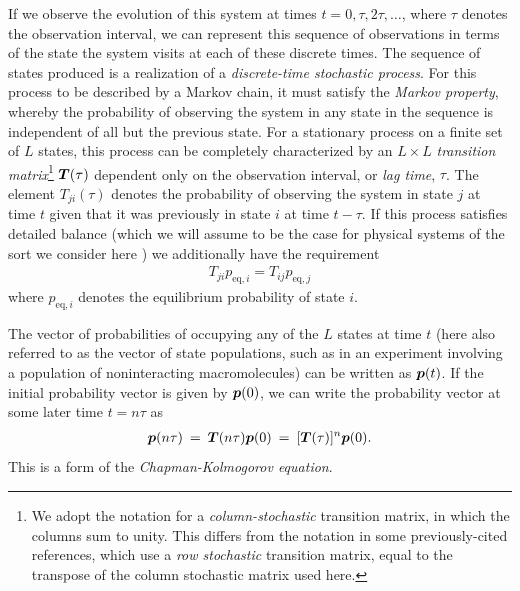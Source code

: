 If we observe the evolution of this system at times $t = 0, \tau, 2 \tau, \ldots$, where $\tau$ denotes the observation interval, we can represent this sequence of observations in terms of the state the system visits at each of these discrete times.
The sequence of states produced is a realization of a \emph{discrete-time stochastic process}.
For this process to be described by a Markov chain, it must satisfy the \emph{Markov property}, whereby the probability of observing the system in any state in the sequence is independent of all but the previous state.
For a stationary process on a finite set of $L$ states, this process can be completely characterized by an $L \times L$ \emph{transition matrix}\footnote{We adopt the notation for a \emph{column-stochastic} transition matrix, in which the columns sum to unity.  This differs from the notation in some previously-cited references, which use a \emph{row stochastic} transition matrix, equal to the transpose of the column stochastic matrix used here.} ${\mbox{\boldmath{$T$}}}(\tau)$ dependent only on the observation interval, or \emph{lag time}, $\tau$.
The element $T_{ji}(\tau)$ denotes the probability of observing the system in state $j$ at time $t$ given that it was previously in state $i$ at time $t-\tau$.
If this process satisfies detailed balance (which we will assume to be the case for physical systems of the sort we consider here \cite{vankampen}) we additionally have the requirement
\begin{eqnarray}
T_{ji} p_{\mathrm{eq},i} = T_{ij} p_{\mathrm{eq},j}
\end{eqnarray}
where $p_{\mathrm{eq},i}$ denotes the equilibrium probability of state $i$.

The vector of probabilities of occupying any of the $L$ states at time $t$ (here also referred to as the vector of state populations, such as in an experiment involving a population of noninteracting macromolecules) can be written as ${\mbox{\boldmath{$p$}}}(t)$.
If the initial probability vector is given by ${\mbox{\boldmath{$p$}}}(0)$, we can write the probability vector at some later time $t=n\tau$ as
\begin{eqnarray}
{\mbox{\boldmath{$p$}}}(n \tau) \: = \: {\mbox{\boldmath{$T$}}}(n \tau) {\mbox{\boldmath{$p$}}}(0) \: = \: [{\mbox{\boldmath{$T$}}}(\tau)]^n {\mbox{\boldmath{$p$}}}(0) . \label{automatic:equation:chapman-kolmogorov}
\end{eqnarray}
This is a form of the \emph{Chapman-Kolmogorov equation}.

